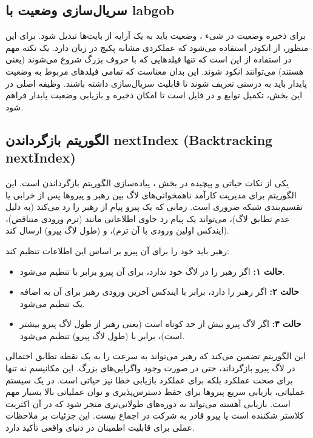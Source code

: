 \documentclass[12pt,a4paper]{article}
\begin{document}
\subsection{سریال‌سازی وضعیت با labgob}

برای ذخیره وضعیت  در شیء ، وضعیت باید به یک آرایه از بایت‌ها تبدیل  شود. برای این منظور، از انکودر  استفاده می‌شود که عملکردی مشابه پکیج  در زبان  دارد. یک نکته مهم در استفاده از  این است که تنها فیلدهایی که با حروف بزرگ شروع می‌شوند (یعنی  هستند) می‌توانند انکود شوند. این بدان معناست که تمامی فیلدهای مربوط به وضعیت پایدار باید به درستی تعریف شوند تا قابلیت سریال‌سازی داشته باشند. وظیفه اصلی در این بخش، تکمیل توابع  و  در فایل  است تا امکان ذخیره و بازیابی وضعیت پایدار فراهم شود.

\subsection{الگوریتم بازگرداندن nextIndex (Backtracking nextIndex)}

یکی از نکات حیاتی و پیچیده در بخش ، پیاده‌سازی الگوریتم بازگرداندن  است. این الگوریتم برای مدیریت کارآمد ناهمخوانی‌های لاگ بین رهبر و پیروها پس از خرابی یا تقسیم‌بندی شبکه ضروری است. زمانی که یک پیرو پیام  از رهبر را رد می‌کند (به دلیل عدم تطابق لاگ)، می‌تواند یک پیام رد  حاوی اطلاعاتی مانند  (ترم ورودی متناقض)،  (ایندکس اولین ورودی با آن ترم)، و  (طول لاگ پیرو) ارسال کند.

رهبر باید  خود را برای آن پیرو بر اساس این اطلاعات تنظیم کند:
\begin{itemize}
    \item \textbf{حالت ۱:} اگر رهبر  را در لاگ خود ندارد،  برای آن پیرو برابر با  تنظیم می‌شود.
    \item \textbf{حالت ۲:} اگر رهبر  را دارد،  برابر با ایندکس آخرین ورودی رهبر برای آن  به اضافه یک تنظیم می‌شود.
    \item \textbf{حالت ۳:} اگر لاگ پیرو بیش از حد کوتاه است (یعنی  رهبر از طول لاگ پیرو بیشتر است)،  برابر با  (طول لاگ پیرو) تنظیم می‌شود.
\end{itemize}

این الگوریتم تضمین می‌کند که رهبر می‌تواند به سرعت  را به یک نقطه تطابق احتمالی در لاگ پیرو بازگرداند، حتی در صورت وجود واگرایی‌های بزرگ. این مکانیسم نه تنها برای صحت عملکرد بلکه برای عملکرد بازیابی خطا نیز حیاتی است. در یک سیستم عملیاتی، بازیابی سریع پیروها برای حفظ دسترس‌پذیری و توان عملیاتی بالا بسیار مهم است. بازیابی آهسته می‌تواند به دوره‌های طولانی‌تری منجر شود که در آن اکثریت کلاستر شکننده است یا پیرو قادر به شرکت در اجماع نیست. این جزئیات بر ملاحظات عملی  برای قابلیت اطمینان در دنیای واقعی تأکید دارد.
\end{document}
